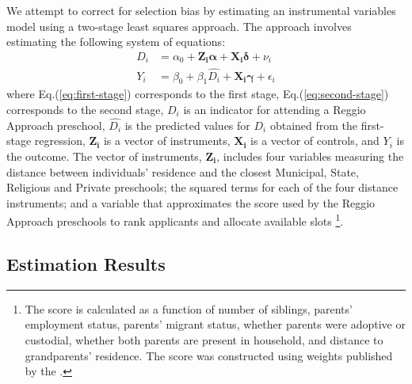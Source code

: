 We attempt to correct for selection bias by estimating an instrumental variables model using a two-stage least squares approach. The approach involves estimating the following system of equations:
\begin{align}
D_i &= \alpha_0 + \bm{Z_i \alpha} + \bm{X_i \delta} + \nu_i \label{eq:first-stage}\\
Y_i &= \beta_0 + \beta_1 \hat{D_i} + \bm{X_i \gamma} + \epsilon_i \label{eq:second-stage}
\end{align}
where Eq.(\ref{eq:first-stage}) corresponds to the first stage, Eq.(\ref{eq:second-stage}) corresponds to the second stage, $D_i$ is an indicator for attending a Reggio Approach preschool, $\hat{D_i}$ is the predicted values for $D_i$ obtained from the first-stage regression, $\bm{Z_i}$ is a vector of instruments, $\bm{X_i}$ is a vector of controls, and $Y_i$ is the outcome. The vector of instruments, $\bm{Z_i}$, includes four variables measuring the distance between individuals' residence and the closest Municipal, State, Religious and Private preschools; the squared terms for each of the four distance instruments; and a variable that approximates the score used by the Reggio Approach preschools to rank applicants and allocate available slots \footnote{The score is calculated as a function of number of siblings, parents' employment status, parents' migrant status, whether parents were adoptive or custodial, whether both parents are present in household, and distance to grandparents' residence. The score was constructed using weights published by the \citet{Reggio-Emilia_2012_Criteria-admission-2013-14}.}.





\subsection{Estimation Results}\label{appendix:iv}
